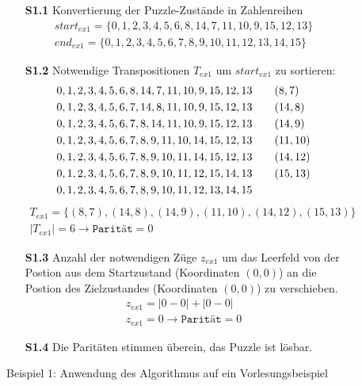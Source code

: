 \begin{figure}[H]
	\begin{enumerate}
		\item[\textbf{S1.1}] Konvertierung der Puzzle-Zustände in Zahlenreihen
		      \begin{align*}
			      start_{ex1} = \{0,1,2,3,4,5,6,8,14,7,11,10,9,15,12,13\} \\
			      end_{ex1} = \{0,1,2,3,4,5,6,7,8,9,10,11,12,13,14,15\}
		      \end{align*}
		\item[\textbf{S1.2}] Notwendige Transpositionen $T_{ex1}$ um $start_{ex1}$ zu sortieren:
		      \begin{align*}
			      0,1,2,3,4,5,6,8,14,7,11,10,9,15,12,13 & \hspace{20pt} (\space 8,\space 7) \\
			      0,1,2,3,4,5,6,7,14,8,11,10,9,15,12,13 & \hspace{20pt} (14,\space 8)       \\
			      0,1,2,3,4,5,6,7,8,14,11,10,9,15,12,13 & \hspace{20pt} (14,\space 9)       \\
			      0,1,2,3,4,5,6,7,8,9,11,10,14,15,12,13 & \hspace{20pt} (11,10)             \\
			      0,1,2,3,4,5,6,7,8,9,10,11,14,15,12,13 & \hspace{20pt} (14,12)             \\
			      0,1,2,3,4,5,6,7,8,9,10,11,12,15,14,13 & \hspace{20pt} (15,13)             \\
			      0,1,2,3,4,5,6,7,8,9,10,11,12,13,14,15 &
		      \end{align*}
		      \begin{align*}
			      T_{ex1} = \{(8,7),(14,8),(14,9),(11,10),(14,12),(15,13)\} \\
			      \left\vert T_{ex1}\right\vert = 6 \rightarrow \texttt{Parität} = 0
		      \end{align*}
		\item[\textbf{S1.3}] Anzahl der notwendigen Züge $z_{ex1}$ um das Leerfeld von der Postion aus dem Startzustand (Koordinaten $(0,0)$) an die Postion des Zielzustandes (Koordinaten $(0,0)$) zu verschieben.
		      \begin{align*}
			      z_{ex1} = \left | 0 - 0 \right | + \left | 0 - 0 \right | \\
			      z_{ex1} = 0 \rightarrow \texttt{Parität} = 0
		      \end{align*}
		\item[\textbf{S1.4}] Die Paritäten stimmen überein, das Puzzle \textcolor{OliveGreen}{ist lösbar}.
	\end{enumerate}
	\caption{Beispiel 1: Anwendung des Algorithmus auf ein Vorlesungsbeispiel \label{fig:Ex1_algo}}
\end{figure}
